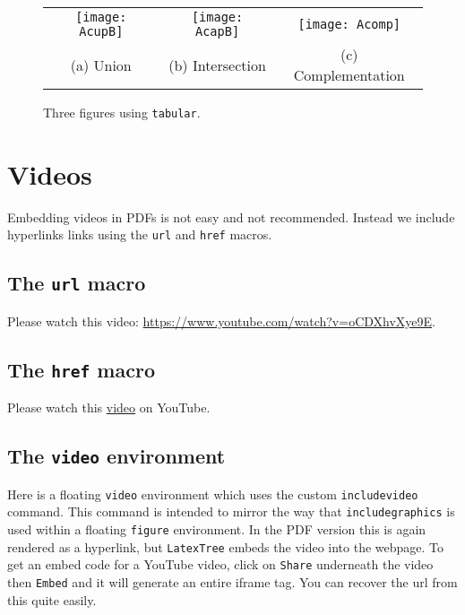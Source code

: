 \begin{figure}[htb]
\centering
\begin{tabular}{ccc}
\texttt{[image: AcupB]} &
\texttt{[image: AcapB]} &
\texttt{[image: Acomp]} \\
(a) Union & (b) Intersection & (c) Complementation \\
\end{tabular}
\caption{Three figures using \texttt{tabular}.\label{fig:setops-tabular}}
\end{figure}

\section{Videos}
Embedding videos in PDFs is not easy and not recommended. Instead we include hyperlinks links using the \texttt{url} and \texttt{href} macros. 


\subsection{The \texttt{url} macro}
Please watch this video: \url{https://www.youtube.com/watch?v=oCDXhvXye9E}.

\subsection{The \texttt{href} macro}
Please watch this \href{https://www.youtube.com/watch?v=oCDXhvXye9E}{video} on YouTube.

\subsection{The \texttt{video} environment}
Here is a floating {\tt video} environment which uses the custom {\tt includevideo} command. This command is intended to mirror the way that {\tt includegraphics} is used within a floating {\tt figure} environment. In the PDF version this is again rendered as a hyperlink, but {\tt LatexTree} embeds the video into the webpage. To get an embed code for a YouTube video, click on {\tt Share} underneath the video then {\tt Embed} and it will generate an entire iframe tag. You can recover the url from this quite easily.

\begin{video}
\centering
{}
\caption{Listen and learn folks!\label{vid:och}}
\end{video}

\endinput

